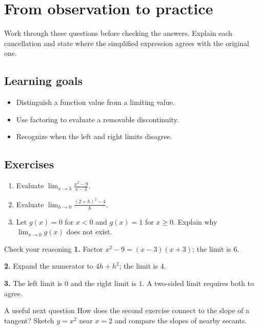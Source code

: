\section{From observation to practice}
Work through these questions before checking the answers. Explain each cancellation and state where the simplified expression agrees with the original one.
\subsection*{Learning goals}
\begin{itemize}
  \item Distinguish a function value from a limiting value.
  \item Use factoring to evaluate a removable discontinuity.
  \item Recognize when the left and right limits disagree.
\end{itemize}
\subsection*{Exercises}
\begin{enumerate}
  \item Evaluate $\displaystyle\lim_{x\to3}\frac{x^2-9}{x-3}$.
  \item Evaluate $\displaystyle\lim_{h\to0}\frac{(2+h)^2-4}{h}$.
  \item Let $g(x)=0$ for $x<0$ and $g(x)=1$ for $x\ge0$. Explain why $\lim_{x\to0}g(x)$ does not exist.
\end{enumerate}
\begin{examplebox}{Check your reasoning}
\textbf{1.} Factor $x^2-9=(x-3)(x+3)$; the limit is $6$.

\textbf{2.} Expand the numerator to $4h+h^2$; the limit is $4$.

\textbf{3.} The left limit is $0$ and the right limit is $1$. A two-sided limit requires both to agree.
\end{examplebox}
\begin{remarkbox}{A useful next question}
How does the second exercise connect to the slope of a tangent? Sketch $y=x^2$ near $x=2$ and compare the slopes of nearby secants.
\end{remarkbox}

